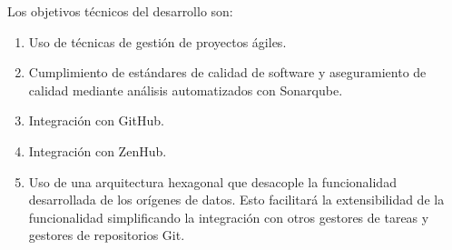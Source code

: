 Los objetivos  técnicos del desarrollo son:

\begin{enumerate}
	\item Uso de técnicas de gestión de proyectos ágiles.
	\item Cumplimiento de estándares de calidad de software y aseguramiento de calidad mediante análisis automatizados con Sonarqube.
	\item Integración con GitHub. 
	\item Integración con ZenHub.
	\item Uso de una arquitectura hexagonal \cite{hexagonal-architecture} que desacople la funcionalidad desarrollada de los orígenes de datos. Esto facilitará la extensibilidad de la funcionalidad simplificando la  integración con otros gestores de tareas y gestores de repositorios Git.
\end{enumerate}